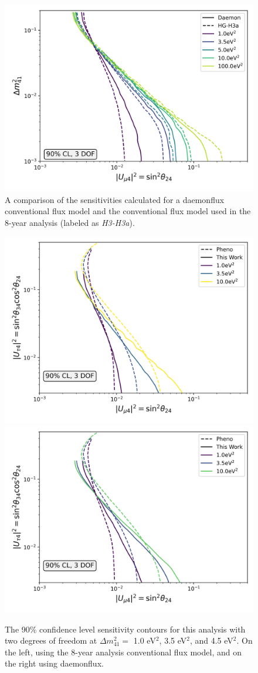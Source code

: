 \documentclass[main.tex]{subfiles}
\begin{document}
\begin{figure}
    \centering
    \includegraphics[width=0.7\linewidth]{figures/double_joint_full_daemon_Realization_daemon_Asimov_sterile_0_cl0.9_dof3.png}
    \caption{A comparison of the sensitivities calculated for a daemonflux conventional flux model and the conventional flux model used in the 8-year analysis (labeled as \textit{H3-H3a}).}\label{fig:asimov_model_compare}
\end{figure}


\begin{figure}
    \centering
    \includegraphics[width=0.45\linewidth]{figures/pheno_joint_asimov_oldairs_Realization_Asimov_sterile_0_cl0.9_dof3.png}%
    \includegraphics[width=0.45\linewidth]{figures/pheno_joint_daemon_update_Realization_daemon_Asimov_sterile_0_cl0.9_dof3.png}
    \caption{The 90\% confidence level sensitivity contours for this analysis with two degrees of freedom at $\Delta m_{41}^{2}=$ 1.0 eV$^{2}$, 3.5 eV$^{2}$, and  4.5 eV$^{2}$. On the left, using the 8-year analysis conventional flux model, and on the right using daemonflux.}\label{fig:pheno_compare}
\end{figure}
\end{document}
